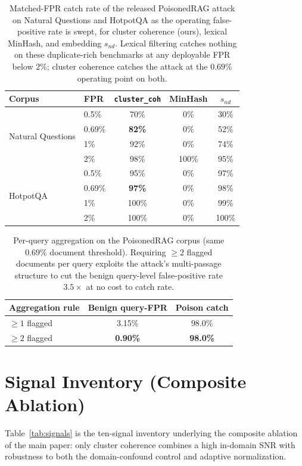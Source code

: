 \documentclass[10pt,journal,compsoc]{IEEEtran}
\begin{document}
\begin{table}[t]
\centering
\caption{Matched-FPR catch rate of the released PoisonedRAG attack on Natural
Questions and HotpotQA as the operating false-positive rate is swept, for cluster
coherence (ours), lexical MinHash, and embedding $s_{nd}$. Lexical filtering catches
nothing on these duplicate-rich benchmarks at any deployable FPR below $2\%$; cluster coherence
catches the attack at the $0.69\%$ operating point on both.}
\label{tab:roc}
\begin{tabular}{llccc}
\toprule
Corpus & FPR & \texttt{cluster\_coh} & MinHash & $s_{nd}$ \\
\midrule
\multirow{4}{*}{Natural Questions}
 & 0.5\%  & 70\% & 0\%   & 30\% \\
 & 0.69\% & \textbf{82\%} & 0\% & 52\% \\
 & 1\%    & 92\% & 0\%   & 74\% \\
 & 2\%    & 98\% & 100\% & 95\% \\
\midrule
\multirow{4}{*}{HotpotQA}
 & 0.5\%  & 95\%  & 0\% & 97\% \\
 & 0.69\% & \textbf{97\%} & 0\% & 98\% \\
 & 1\%    & 100\% & 0\% & 99\% \\
 & 2\%    & 100\% & 0\% & 100\% \\
\bottomrule
\end{tabular}
\end{table}

\begin{table}[t]
\centering
\caption{Per-query aggregation on the PoisonedRAG corpus (same $0.69\%$ document
threshold). Requiring $\geq\!2$ flagged documents per query exploits the attack's
multi-passage structure to cut the benign query-level false-positive rate
$3.5\times$ at no cost to catch rate.}
\label{tab:agg}
\begin{tabular}{lcc}
\toprule
Aggregation rule & Benign query-FPR & Poison catch \\
\midrule
$\geq\!1$ flagged & 3.15\% & 98.0\% \\
$\geq\!2$ flagged & \textbf{0.90\%} & \textbf{98.0\%} \\
\bottomrule
\end{tabular}
\end{table}

\section{Signal Inventory (Composite Ablation)}
\label{app:signals}
Table~\ref{tab:signals} is the ten-signal inventory underlying the composite ablation of the
main paper: only cluster coherence combines a high in-domain SNR with robustness to both the
domain-confound control and adaptive normalization.
\end{document}
